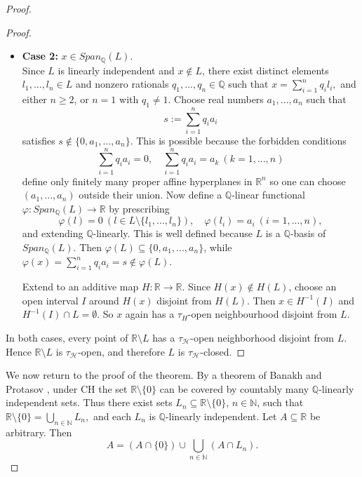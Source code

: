 \documentclass[11pt]{amsart} %
\theoremstyle{definition}
\newcommand{\AD}{\mathcal{H}}
\begin{document}
\begin{proof}
\begin{proof}
\begin{itemize}
\item[-] \noindent \textbf{Case 2:} $x\in Span_{\mathbb{Q}}(L)$. \\
Since $L$ is linearly independent and $x\notin L$, there exist distinct elements $l_{1},...,l_{n}\in L$ and nonzero rationals $q_{1},...,q_{n}\in\mathbb{Q}$ such that $x=\sum_{i=1}^{n}q_{i}l_{i},$ 
and either $n\ge2$, or $n=1$ with $q_{1}\ne1$. Choose real numbers $a_{1},...,a_{n}$ such that
\begin{equation} 
s:=\sum_{i=1}^{n}q_{i}a_{i} \end{equation} 
satisfies $s\notin\{0,a_{1},...,a_{n}\}$. This is possible because the forbidden conditions
\begin{equation} 
\sum_{i=1}^{n}q_{i}a_{i}=0, \quad \sum_{i=1}^{n}q_{i}a_{i}=a_{k} \ (k=1,...,n) 
\end{equation} 
define only finitely many proper affine hyperplanes in $\mathbb{R}^{n}$ so one can choose $(a_{1},...,a_{n})$ outside their union. Now define a $\mathbb{Q}$-linear functional $\varphi:Span_{\mathbb{Q}}(L)\rightarrow\mathbb{R}$ by prescribing
\begin{equation} 
\varphi(l)=0 \ (l\in L\setminus\{l_{1},...,l_{n}\}), \quad \varphi(l_{i})=a_{i} \ (i=1,...,n), \end{equation} 
and extending $\mathbb{Q}$-linearly. This is well defined because $L$ is a $\mathbb{Q}$-basis of $Span_{\mathbb{Q}}(L)$. Then $\varphi(L)\subseteq\{0,a_{1},...,a_{n}\}$, while $\varphi(x)=\sum_{i=1}^{n}q_{i}a_{i}=s\notin\varphi(L)$.

Extend to an additive map $H:\mathbb{R}\rightarrow\mathbb{R}$. Since $H(x)\notin H(L)$, choose an open interval $I$ around $H(x)$ disjoint from $H(L)$. Then $x\in H^{-1}(I)$ and $H^{-1}(I)\cap L=\emptyset$. So $x$ again has a $\tau_{H}$-open neighbourhood disjoint from $L$.
\end{itemize} 
In both cases, every point of $\mathbb{R}\setminus L$ has a $\tau_{\AD}$-open neighborhood disjoint from $L$. Hence $\mathbb{R}\setminus L$ is $\tau_{\AD}$-open, and therefore $L$ is $\tau_{\AD}$-closed.
\end{proof}

We now return to the proof of the theorem. By a theorem of Banakh and Protasov \cite{2}, under CH the set $\mathbb{R}\setminus\{0\}$ can be covered by countably many $\mathbb{Q}$-linearly independent sets. Thus there exist sets $L_{n}\subseteq\mathbb{R}\setminus\{0\}$, $n\in\mathbb{N}$, such that $\mathbb{R}\setminus\{0\}=\bigcup_{n\in\mathbb{N}}L_{n},$ 
and each $L_{n}$ is $\mathbb{Q}$-linearly independent. Let $A\subseteq\mathbb{R}$ be arbitrary. Then
\begin{equation} 
A=(A\cap\{0\})\cup\bigcup_{n\in\mathbb{N}}(A\cap L_{n}). \end{equation} 


\end{proof}
\end{document}
